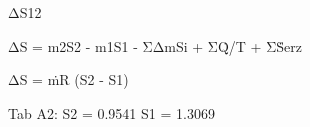 ΔS12  

ΔS = m2S2 - m1S1 - ΣΔmSi + ΣQ̇/T + ΣṠerz  

ΔS = ṁR (S2 - S1)  

Tab A2:  
S2 = 0.9541  
S1 = 1.3069